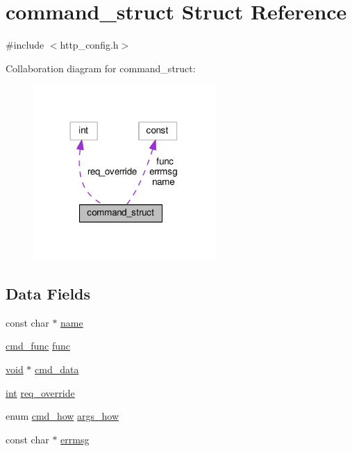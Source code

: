 \hypertarget{structcommand__struct}{}\section{command\+\_\+struct Struct Reference}
\label{structcommand__struct}


{\ttfamily \#include $<$http\+\_\+config.\+h$>$}



Collaboration diagram for command\+\_\+struct\+:
\nopagebreak
\begin{figure}[H]
\begin{center}
\leavevmode
\includegraphics[width=197pt]{structcommand__struct__coll__graph}
\end{center}
\end{figure}
\subsection*{Data Fields}
\begin{DoxyCompactItemize}
\item 
const char $\ast$ \hyperlink{structcommand__struct_a51b094b470fe4ab204f47c29580e3170}{name}
\item 
\hyperlink{group__APACHE__CORE__CONFIG_gad46309b45efbf192bb44197ed4e37b5f}{cmd\+\_\+func} \hyperlink{structcommand__struct_aa00d440ddb85b0179109e00c421628e6}{func}
\item 
\hyperlink{group__MOD__ISAPI_gacd6cdbf73df3d9eed42fa493d9b621a6}{void} $\ast$ \hyperlink{structcommand__struct_a62f7f7a0709cb58e9a0369739d4481ac}{cmd\+\_\+data}
\item 
\hyperlink{pcre_8txt_a42dfa4ff673c82d8efe7144098fbc198}{int} \hyperlink{structcommand__struct_ad8b92b9bb5aa79f2cdeff6ab146c2e50}{req\+\_\+override}
\item 
enum \hyperlink{group__APACHE__CORE__CONFIG_ga07442bbd6a047ee13383f52b9670b026}{cmd\+\_\+how} \hyperlink{structcommand__struct_a7ef43a10549eb3012637c776a42eb7a7}{args\+\_\+how}
\item 
const char $\ast$ \hyperlink{structcommand__struct_a014f65b75698bbe337db0a5c3cf330d0}{errmsg}
\end{DoxyCompactItemize}


